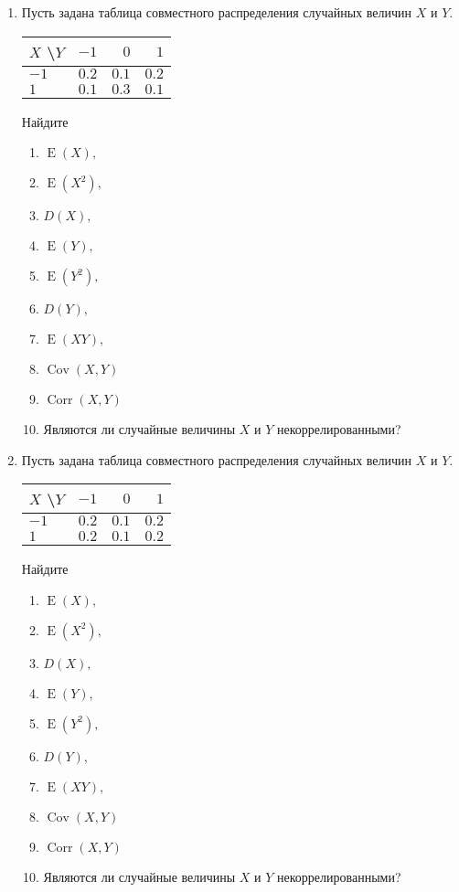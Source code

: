 \documentclass[12pt]{article}
\DeclareMathOperator{\Cov}{Cov}
\DeclareMathOperator{\Corr}{Corr}
\DeclareMathOperator{\E}{E}
\begin{document}
\begin{enumerate}
\item Пусть задана таблица совместного распределения случайных величин $X$ и $Y$.

\begin{center}\begin{tabular}{l|rrr}
\toprule
 $X$ \textbackslash $Y$    & $-1$  & $0$   & $1$   \\ \midrule
$-1$                 & $0.2$ & $0.1$ & $0.2$ \\
 $1$                 & $0.1$ & $0.3$ & $0.1$ \\ \bottomrule
\end{tabular}\end{center}

Найдите  
\begin{enumerate}
    \item $\E(X),$  
    \item $\E(X^{2}),$  
	\item $D(X),$  
    \item $\E(Y),$  
    \item $\E(Y^{2}),$  
    \item $D(Y),$  
    \item $\E(XY),$  
	\item $\Cov(X,Y)$  
    \item $\Corr(X,Y)$  
    \item Являются ли случайные величины $X$ и $Y$ некоррелированными?  
\end{enumerate}

\item Пусть задана таблица совместного распределения случайных величин $X$ и $Y$.

\begin{center}\begin{tabular}{l|rrr}
\toprule
 $X$ \textbackslash $Y$    & $-1$  &$ 0 $  & $1 $  \\ \midrule
$-1$                 & $0.2$ & $0.1$ & $0.2$ \\ 
 $1$                 & $0.2$ & $0.1$ & $0.2$ \\ \bottomrule
\end{tabular}\end{center}

Найдите  
\begin{enumerate}
    \item $\E(X),$  
    \item $\E(X^{2}),$  
	\item $D(X),$  
    \item $\E(Y),$  
    \item $\E(Y^{2}),$  
    \item $D(Y),$  
    \item $\E(XY),$  
	\item $\Cov(X,Y)$  
    \item $\Corr(X,Y)$  
    \item Являются ли случайные величины $X$ и $Y$ некоррелированными?  
\end{enumerate}


\end{enumerate}
\end{document}
